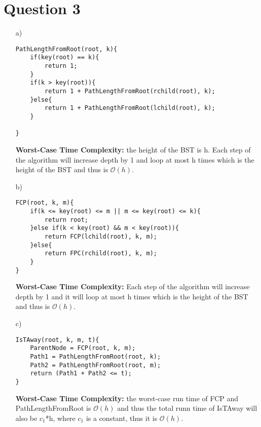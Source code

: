 \documentclass[10pt]{article}
\begin{document}
\section*{Question 3}
\begin{itemize}
\item[a)]
\begin{lstlisting}[frame=single]
PathLengthFromRoot(root, k){
    if(key(root) == k){
        return 1;    
    }
    if(k > key(root)){
		return 1 + PathLengthFromRoot(rchild(root), k);
    }else{
		return 1 + PathLengthFromRoot(lchild(root), k);
    }

}
\end{lstlisting}
\textbf{Worst-Case Time Complexity:} the height of the BST is h. Each step of the algorithm will increase depth by 1 and loop at most h times which is the height of the BST and thus is $\mathcal{O}(h)$.
\item[b)]
\begin{lstlisting}[frame=single]
FCP(root, k, m){
    if(k <= key(root) <= m || m <= key(root) <= k){
		return root;    
    }else if(k < key(root) && m < key(root)){
		return FCP(lchild(root), k, m);    
    }else{
		return FPC(rchild(root), k, m);    
    }
}
\end{lstlisting}
\textbf{Worst-Case Time Complexity:} Each step of the algorithm will increase depth by 1 and it will loop at most h times which is the height of the BST and thus is $\mathcal{O}(h)$.

\item[c)]
\begin{lstlisting}[frame=single]
IsTAway(root, k, m, t){
    ParentNode = FCP(root, k, m);
    Path1 = PathLengthFromRoot(root, k);
    Path2 = PathLengthFromRoot(root, m);
    return (Path1 + Path2 <= t);
}
\end{lstlisting}
\textbf{Worst-Case Time Complexity:} the worst-case run time of FCP and PathLengthFromRoot is $\mathcal{O}(h)$ and thus the total runn time of IsTAway will also be $c_1$*h, where $c_1$ is a constant, thus it is $\mathcal{O}(h)$.
\end{itemize}
\end{document}
